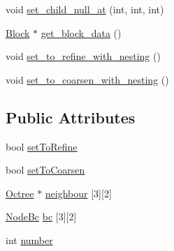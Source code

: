 \begin{DoxyCompactItemize}
\item 
void \hyperlink{classmy_octree_1_1_octree_a46db2965b2ffb44a89259bc98c36f750}{set\+\_\+child\+\_\+null\+\_\+at} (int, int, int)
\item 
\hyperlink{classmy_octree_1_1_block}{Block} $\ast$ \hyperlink{classmy_octree_1_1_octree_a6305300a53ef94f0234f595d524d6114}{get\+\_\+block\+\_\+data} ()
\item 
void \hyperlink{classmy_octree_1_1_octree_a890ebf52fec4c2d881106932a5cfa4ec}{set\+\_\+to\+\_\+refine\+\_\+with\+\_\+nesting} ()
\item 
void \hyperlink{classmy_octree_1_1_octree_a4d094c37db1ac00ca69a331f0320455b}{set\+\_\+to\+\_\+coarsen\+\_\+with\+\_\+nesting} ()
\end{DoxyCompactItemize}
\subsection*{Public Attributes}
\begin{DoxyCompactItemize}
\item 
bool \hyperlink{classmy_octree_1_1_octree_aad874752825bfcf0631d51abddcd6f8d}{set\+To\+Refine}
\item 
bool \hyperlink{classmy_octree_1_1_octree_a4fb4740c2e6cee437bd9e6c2268a0fd2}{set\+To\+Coarsen}
\item 
\hyperlink{classmy_octree_1_1_octree}{Octree} $\ast$ \hyperlink{classmy_octree_1_1_octree_a667ca17260eb69985476f64fe877b626}{neighbour} \mbox{[}3\mbox{]}\mbox{[}2\mbox{]}
\item 
\hyperlink{namespacemy_octree_adc4c8dcd84e804f57592145c650dd017}{Node\+Bc} \hyperlink{classmy_octree_1_1_octree_a5f1bf21928a132fd13eb4aed27d927f9}{bc} \mbox{[}3\mbox{]}\mbox{[}2\mbox{]}
\item 
int \hyperlink{classmy_octree_1_1_octree_a86d3fb8b805509bc5522b8b470d2c682}{number}
\end{DoxyCompactItemize}
